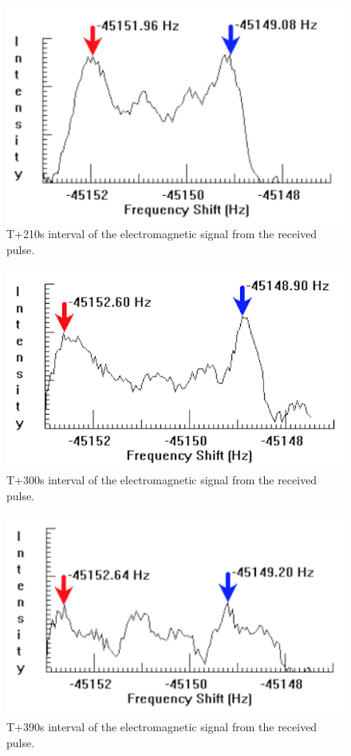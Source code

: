 \documentclass[11pt]{article}
\begin{document}
\begin{multicols}{2}
\begin{figure}[H]
\centering
\includegraphics[scale=0.5]{Present_Images.png/1_-_T+210ms.png}
\caption{T+210s interval of the electromagnetic signal from the received pulse.}
\label{1-T+210}
\end{figure}

\begin{figure}[H]
\centering
\includegraphics[scale=0.7]{Present_Images.png/1_-_T+300ms.png}
\caption{T+300s interval of the electromagnetic signal from the received pulse.}
\label{1-T+300}
\end{figure}

\begin{figure}[H]
\centering
\includegraphics[scale=0.5]{Present_Images.png/1_-_T+390ms.png}
\caption{T+390s interval of the electromagnetic signal from the received pulse.}
\label{1-T+390}
\end{figure}


\end{multicols}
\end{document}
